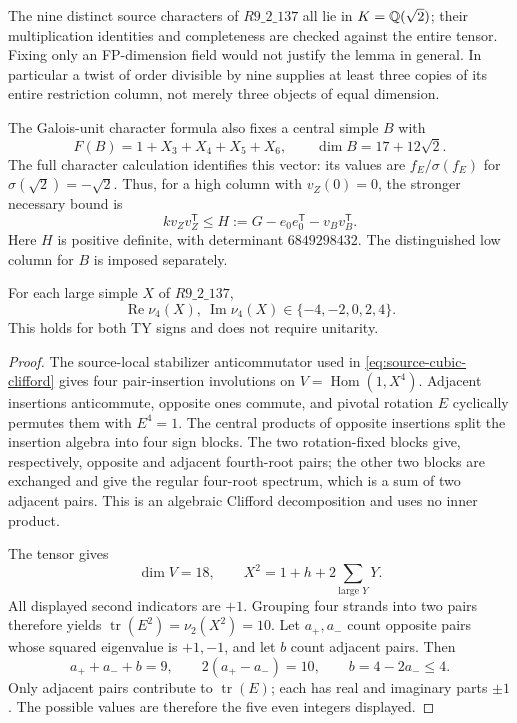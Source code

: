 The nine distinct source characters of $R9\_2\_137$ all lie in
$K=\mathbb Q(\sqrt2)$; their multiplication identities and completeness are
checked against the entire tensor. Fixing only an FP-dimension field
would not justify the lemma in general. In particular a twist of order
divisible by nine supplies at least three copies of its entire
restriction column, not merely three objects of equal dimension.

The Galois-unit character formula also fixes a central simple $B$ with
\[
 F(B)=1+X_3+X_4+X_5+X_6,\qquad \dim B=17+12\sqrt2.
\]
The full character calculation identifies this vector: its values are
$f_E/\sigma(f_E)$ for $\sigma(\sqrt2)=-\sqrt2$.
Thus, for a high column with $v_Z(0)=0$, the stronger necessary bound is
\begin{equation}\tag{G137}\label{eq:r137-residual-gram}
 k v_Zv_Z^{\mathsf T}\le
 H:=G-e_0e_0^{\mathsf T}-v_Bv_B^{\mathsf T}.
\end{equation}
Here $H$ is positive definite, with determinant $6849298432$. The
distinguished low column for $B$ is imposed separately.

\begin{proposition}
For each large simple $X$ of $R9\_2\_137$,
\[
 \operatorname{Re}\nu_4(X),\ \operatorname{Im}\nu_4(X)
 \in\{-4,-2,0,2,4\}.
\]
This holds for both TY signs and does not require unitarity.
\end{proposition}
\begin{proof}
The source-local stabilizer anticommutator used in
\eqref{eq:source-cubic-clifford} gives four pair-insertion involutions
on $V=\operatorname{Hom}(1,X^4)$. Adjacent insertions anticommute,
opposite ones commute, and pivotal rotation $E$ cyclically permutes
them with $E^4=1$. The central products of opposite insertions split
the insertion algebra into four sign blocks. The two rotation-fixed
blocks give, respectively, opposite and adjacent fourth-root pairs;
the other two blocks are exchanged and give the regular four-root
spectrum, which is a sum of two adjacent pairs. This is an algebraic
Clifford decomposition and uses no inner product.

The tensor gives
\[
 \dim V=18,\qquad X^2=1+h+2\sum_{\text{large }Y}Y.
\]
All displayed second indicators are $+1$. Grouping four strands into
two pairs therefore yields
$\operatorname{tr}(E^2)=\nu_2(X^2)=10$.
Let $a_+,a_-$ count opposite pairs whose squared eigenvalue is
$+1,-1$, and let $b$ count adjacent pairs. Then
\[
 a_++a_-+b=9,\qquad 2(a_+-a_-)=10,\qquad b=4-2a_-\le4.
\]
Only adjacent pairs contribute to $\operatorname{tr}(E)$; each has
real and imaginary parts $\pm1$. The possible values are therefore
the five even integers displayed.
\end{proof}

